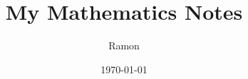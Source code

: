 \documentclass{article}
\begin{document}
	
	\title{My Mathematics Notes}
	\author{Ramon}
	\date{\today}
	
	\maketitle
	
	
\end{document}
